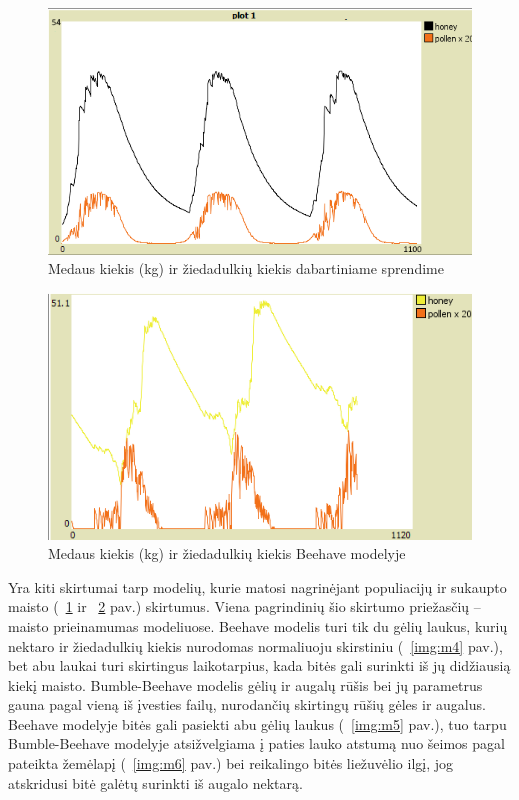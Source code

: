 \documentclass{VUMIFPSmagistrinis}
\begin{document}
\begin{figure}[H]
    \centering
    \includegraphics[scale=0.75]{img/mtd3/mtdp3v11-img002.png}
    \caption{Medaus kiekis (kg) ir žiedadulkių kiekis dabartiniame sprendime}
    \label{img:m2}
\end{figure}

\begin{figure}[H]
    \centering
    \includegraphics[scale=0.75]{img/mtd3/mtdp3v11-img003.png}
    \caption{Medaus kiekis (kg) ir žiedadulkių kiekis Beehave modelyje}
    \label{img:m3}
\end{figure}


	 Yra kiti skirtumai tarp modelių, kurie matosi nagrinėjant populiacijų ir sukaupto maisto (~\ref{img:m2} ir ~\ref{img:m3} pav.) skirtumus. Viena pagrindinių šio skirtumo priežasčių – maisto prieinamumas modeliuose. Beehave modelis turi tik du gėlių laukus, kurių nektaro ir žiedadulkių kiekis nurodomas normaliuoju skirstiniu (~\ref{img:m4} pav.), bet abu laukai turi skirtingus laikotarpius, kada bitės gali surinkti iš jų didžiausią kiekį maisto. Bumble-Beehave modelis gėlių ir augalų rūšis bei jų parametrus gauna pagal vieną iš įvesties failų, nurodančių skirtingų rūšių gėles ir augalus. Beehave modelyje bitės gali pasiekti abu gėlių laukus (~\ref{img:m5} pav.), tuo tarpu Bumble-Beehave modelyje atsižvelgiama į paties lauko atstumą nuo šeimos pagal pateikta žemėlapį (~\ref{img:m6} pav.) bei reikalingo bitės liežuvėlio ilgį, jog atskridusi bitė galėtų surinkti iš augalo nektarą.
\end{document}
